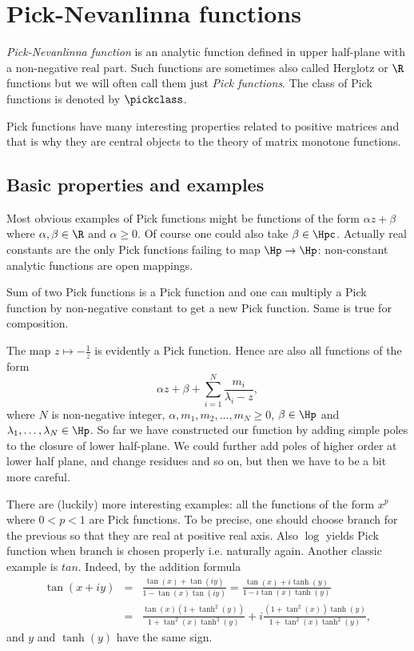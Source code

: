 \chapter{Pick-Nevanlinna functions}

\textit{Pick-Nevanlinna function} is an analytic function defined in upper half-plane with a non-negative real part. Such functions are sometimes also called Herglotz or $\R$ functions but we will often call them just \textit{Pick functions}. The class of Pick functions is denoted by $\pickclass$.

Pick functions have many interesting properties related to positive matrices and that is why they are central objects to the theory of matrix monotone functions.

\section{Basic properties and examples}

Most obvious examples of Pick functions might be functions of the form $\alpha z + \beta$ where $\alpha, \beta \in \R$ and $\alpha \geq 0$. Of course one could also take $\beta \in \Hpc$. Actually real constants are the only Pick functions failing to map $\Hp \to \Hp$: non-constant analytic functions are open mappings.

Sum of two Pick functions is a Pick function and one can multiply a Pick function by non-negative constant to get a new Pick function. Same is true for composition.

The map $z \mapsto -\frac{1}{z}$ is evidently a Pick function. Hence are also all functions of the form
\[
	\alpha z + \beta + \sum_{i = 1}^{N} \frac{m_{i}}{\lambda_{i}- z},
\]
where $N$ is non-negative integer, $\alpha, m_{1}, m_{2}, \ldots, m_{N} \geq 0$, $\beta \in \Hp$ and $\lambda_{1}, \ldots, \lambda_{N} \in \Hp$. So far we have constructed our function by adding simple poles to the closure of lower half-plane. We could further add poles of higher order at lower half plane, and change residues and so on, but then we have to be a bit more careful.

There are (luckily) more interesting examples: all the functions of the form $x^{p}$ where $0 < p < 1$ are Pick functions. To be precise, one should choose branch for the previous so that they are real at positive real axis. Also $\log$ yields Pick function when branch is chosen properly i.e. naturally again. Another classic example is $tan$. Indeed, by the addition formula
\begin{eqnarray*}
	\tan(x + i y) &=& \frac{\tan(x) + \tan(i y)}{1 - \tan(x) \tan(i y)} = \frac{\tan(x) + i \tanh(y)}{1 - i \tan(x) \tanh(y)} \\
	&=& \frac{\tan(x)(1 + \tanh^2(y))}{1 + \tan^2(x) \tanh^2(y)} + i \frac{(1 + \tan^2(x))\tanh(y)}{1 + \tan^2(x) \tanh^2(y)},
\end{eqnarray*}
and $y$ and $\tanh(y)$ have the same sign.

